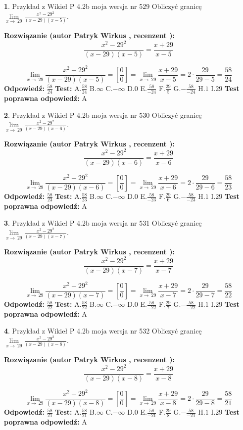 \documentclass[12pt, a4paper]{article}
\theoremstyle{definition} %
\newtheorem{zad}{}
\newcommand{\zadStart}[1]{\begin{zad}#1\newline}
\newcommand{\zadStop}{\end{zad}}
\newcommand{\rozwStart}[2]{\noindent \textbf{Rozwiązanie (autor #1 , recenzent #2): }\newline}
\newcommand{\rozwStop}{\newline}
\newcommand{\odpStart}{\noindent \textbf{Odpowiedź:}\newline}
\newcommand{\odpStop}{\newline}
\newcommand{\testStart}{\noindent \textbf{Test:}\newline}
\newcommand{\testStop}{\newline}
\newcommand{\kluczStart}{\noindent \textbf{Test poprawna odpowiedź:}\newline}
\newcommand{\kluczStop}{\newline}
\begin{document}
\zadStart{Przykład z Wikieł P 4.2b moja wersja nr 529}
Obliczyć granicę $\lim\limits_{x\to\ 29}\frac{x^{2}-29^{2}}{(x-29)(x-5)}$.
\zadStop
\rozwStart{Patryk Wirkus}{}
$$\frac{x^{2}-29^{2}}{(x-29)(x-5)}=\frac{x+29}{x-5}$$

$$\lim\limits_{x\to\ 29}\frac{x^{2}-29^{2}}{(x-29)(x-5)}=[\frac{0}{0}]=\lim\limits_{x\to\ 29}\frac{x+29}{x-5}=2 \cdot \frac{29}{29-5} = \frac{58}{24}$$
\rozwStop
\odpStart
$\frac{58}{24}$
\odpStop
\testStart
A.$\frac{58}{24}$
B.$\infty$
C.$-\infty$
D.$0$
E.$\frac{58}{-24}$
F.$\frac{29}{5}$
G.$-\frac{58}{-24}$
H.$1$
I.$29$
\testStop
\kluczStart
A
\kluczStop



\zadStart{Przykład z Wikieł P 4.2b moja wersja nr 530}
Obliczyć granicę $\lim\limits_{x\to\ 29}\frac{x^{2}-29^{2}}{(x-29)(x-6)}$.
\zadStop
\rozwStart{Patryk Wirkus}{}
$$\frac{x^{2}-29^{2}}{(x-29)(x-6)}=\frac{x+29}{x-6}$$

$$\lim\limits_{x\to\ 29}\frac{x^{2}-29^{2}}{(x-29)(x-6)}=[\frac{0}{0}]=\lim\limits_{x\to\ 29}\frac{x+29}{x-6}=2 \cdot \frac{29}{29-6} = \frac{58}{23}$$
\rozwStop
\odpStart
$\frac{58}{23}$
\odpStop
\testStart
A.$\frac{58}{23}$
B.$\infty$
C.$-\infty$
D.$0$
E.$\frac{58}{-23}$
F.$\frac{29}{6}$
G.$-\frac{58}{-23}$
H.$1$
I.$29$
\testStop
\kluczStart
A
\kluczStop



\zadStart{Przykład z Wikieł P 4.2b moja wersja nr 531}
Obliczyć granicę $\lim\limits_{x\to\ 29}\frac{x^{2}-29^{2}}{(x-29)(x-7)}$.
\zadStop
\rozwStart{Patryk Wirkus}{}
$$\frac{x^{2}-29^{2}}{(x-29)(x-7)}=\frac{x+29}{x-7}$$

$$\lim\limits_{x\to\ 29}\frac{x^{2}-29^{2}}{(x-29)(x-7)}=[\frac{0}{0}]=\lim\limits_{x\to\ 29}\frac{x+29}{x-7}=2 \cdot \frac{29}{29-7} = \frac{58}{22}$$
\rozwStop
\odpStart
$\frac{58}{22}$
\odpStop
\testStart
A.$\frac{58}{22}$
B.$\infty$
C.$-\infty$
D.$0$
E.$\frac{58}{-22}$
F.$\frac{29}{7}$
G.$-\frac{58}{-22}$
H.$1$
I.$29$
\testStop
\kluczStart
A
\kluczStop



\zadStart{Przykład z Wikieł P 4.2b moja wersja nr 532}
Obliczyć granicę $\lim\limits_{x\to\ 29}\frac{x^{2}-29^{2}}{(x-29)(x-8)}$.
\zadStop
\rozwStart{Patryk Wirkus}{}
$$\frac{x^{2}-29^{2}}{(x-29)(x-8)}=\frac{x+29}{x-8}$$

$$\lim\limits_{x\to\ 29}\frac{x^{2}-29^{2}}{(x-29)(x-8)}=[\frac{0}{0}]=\lim\limits_{x\to\ 29}\frac{x+29}{x-8}=2 \cdot \frac{29}{29-8} = \frac{58}{21}$$
\rozwStop
\odpStart
$\frac{58}{21}$
\odpStop
\testStart
A.$\frac{58}{21}$
B.$\infty$
C.$-\infty$
D.$0$
E.$\frac{58}{-21}$
F.$\frac{29}{8}$
G.$-\frac{58}{-21}$
H.$1$
I.$29$
\testStop
\kluczStart
A
\kluczStop
\end{document}
